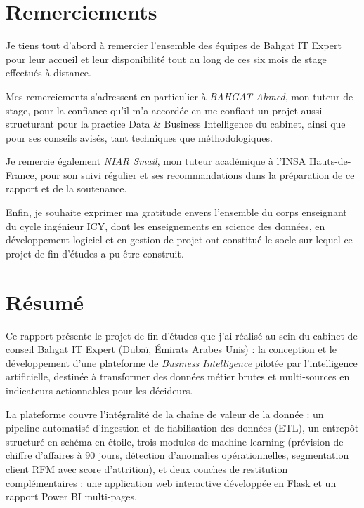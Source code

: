 \documentclass[12pt,a4paper]{report}
\begin{document}
\chapter*{Remerciements}

Je tiens tout d'abord à remercier l'ensemble des équipes de Bahgat IT Expert
pour leur accueil et leur disponibilité tout au long de ces six mois de stage
effectués à distance.

Mes remerciements s'adressent en particulier à \textit{BAHGAT Ahmed}, mon tuteur de stage, pour la confiance qu'il m'a accordée en me
confiant un projet aussi structurant pour la practice Data \& Business
Intelligence du cabinet, ainsi que pour ses conseils avisés, tant techniques que
méthodologiques. 

Je remercie également \textit{NIAR Smail}, mon tuteur académique à
l'INSA Hauts-de-France, pour son suivi régulier et ses recommandations dans la
préparation de ce rapport et de la soutenance.

Enfin, je souhaite exprimer ma gratitude envers l'ensemble du corps enseignant
du cycle ingénieur ICY, dont les enseignements en science des données, en
développement logiciel et en gestion de projet ont constitué le socle sur
lequel ce projet de fin d'études a pu être construit.

\chapter*{Résumé}

Ce rapport présente le projet de fin d'études que j'ai réalisé au sein du
cabinet de conseil Bahgat IT Expert (Dubaï, Émirats Arabes Unis) : la
conception et le développement d'une plateforme de \textit{Business
Intelligence} pilotée par l'intelligence artificielle, destinée à transformer
des données métier brutes et multi-sources en indicateurs actionnables pour les
décideurs.

La plateforme couvre l'intégralité de la chaîne de valeur de la donnée : un
pipeline automatisé d'ingestion et de fiabilisation des données (ETL), un
entrepôt structuré en schéma en étoile, trois modules de machine learning
(prévision de chiffre d'affaires à 90 jours, détection d'anomalies
opérationnelles, segmentation client RFM avec score d'attrition), et deux
couches de restitution complémentaires : une application web interactive
développée en Flask et un rapport Power BI multi-pages.
\end{document}
